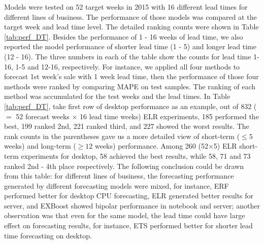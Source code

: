 \documentclass{llncs}
\begin{document}
Models were tested on 52 target weeks in 2015 with 16 different lead times for different lines of business. The performance of those models was compared at the target week and lead time level. The detailed ranking counts were shown in Table \ref{tab:perf_DT}. Besides the performance of 1 - 16 weeks of lead time, we also reported the model performance of shorter lead time (1 - 5) and longer lead time (12 - 16). The three numbers in each of the table show the counts for lead time 1-16, 1-5 and 12-16, respectively. For instance, we applied all four methods to forecast 1st week's sale with 1 week lead time, then the performance of those four methods were ranked by comparing MAPE on test samples. The ranking of each method was accumulated for the test weeks and the lead times. In Table \ref{tab:perf_DT}, take first row of desktop performance as an example, out of 832 ($=$ 52 forecast weeks $\times$ 16 lead time weeks) ELR experiments, 185 performed the best, 199 ranked 2nd, 221 ranked third, and 227 showed the worst results. The rank counts in the parentheses gave us a more detailed view of short-term ($\leq5$ weeks) and long-term ($\geq12$ weeks) performance. Among 260 (52$\times$5) ELR short-term experiments for desktop, 58 achieved the best results, while 58, 71 and 73 ranked 2nd - 4th place respectively. The following conclusion could be drawn from this table: for different lines of business, the forecasting performance generated by different forecasting models were mixed, for instance, ERF performed better for desktop CPU forecasting, ELR generated better results for server, and EXBoost showed bipolar performance in notebook and server; another observation was that even for the same model, the lead time could have large effect on forecasting results, for instance, ETS performed better for shorter lead time forecasting on desktop.
\end{document}
